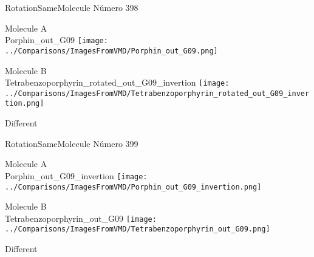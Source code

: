 \vtab[-3cm]
\begin{center}
{\large RotationSameMolecule \tab Número 398}
\end{center}
\begin{multicols}{2}
\begin{center}
Molecule A \\ 
Porphin\_out\_G09
\texttt{[image: ../Comparisons/ImagesFromVMD/Porphin\_out\_G09.png]}
\\
\vtab

\columnbreak
Molecule B \\ 
Tetrabenzoporphyrin\_rotated\_out\_G09\_invertion
\texttt{[image: ../Comparisons/ImagesFromVMD/Tetrabenzoporphyrin\_rotated\_out\_G09\_invertion.png]}
\\
\vtab


\end{center}
\end{multicols}
\begin{center}
\textcolor{NavyBlue}{\Large Different}
\end{center}

 \newpage

\vtab[-3cm]
\begin{center}
{\large RotationSameMolecule \tab Número 399}
\end{center}
\begin{multicols}{2}
\begin{center}
Molecule A \\ 
Porphin\_out\_G09\_invertion
\texttt{[image: ../Comparisons/ImagesFromVMD/Porphin\_out\_G09\_invertion.png]}
\\
\vtab

\columnbreak
Molecule B \\ 
Tetrabenzoporphyrin\_out\_G09
\texttt{[image: ../Comparisons/ImagesFromVMD/Tetrabenzoporphyrin\_out\_G09.png]}
\\
\vtab


\end{center}
\end{multicols}
\begin{center}
\textcolor{NavyBlue}{\Large Different}
\end{center}

 \newpage

